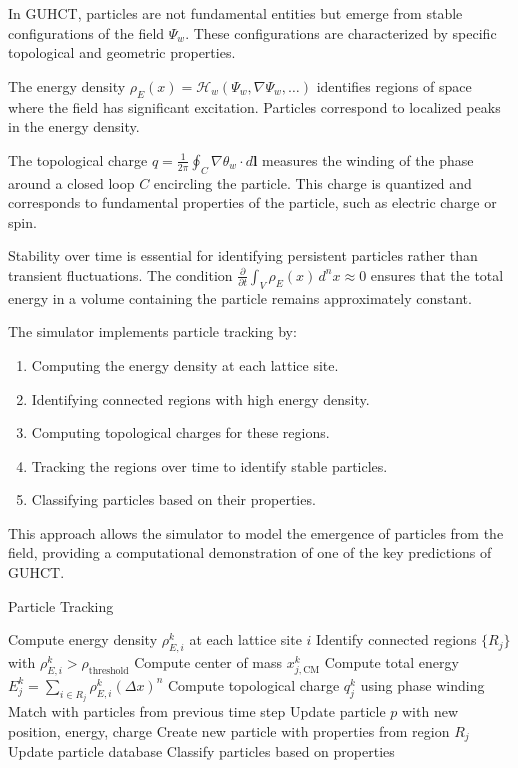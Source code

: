 \documentclass[11pt,a4paper]{article}
\makeatletter
\renewenvironment{proof}[1][\proofname]{\par
  \pushQED{\qed}%
  \normalfont \topsep6\p@\@plus6\p@\relax
  \trivlist
  \item[\hskip\labelsep
        \itshape
    #1\@addpunct{.}]\ignorespaces
}{%
  \popQED\endtrivlist\@endpefalse
}
\makeatother
\begin{document}
\begin{proof}
In GUHCT, particles are not fundamental entities but emerge from stable configurations of the field $\Psi_w$. These configurations are characterized by specific topological and geometric properties.

The energy density $\rho_E(x) = \mathcal{H}_w(\Psi_w, \nabla\Psi_w, \ldots)$ identifies regions of space where the field has significant excitation. Particles correspond to localized peaks in the energy density.

The topological charge $q = \frac{1}{2\pi} \oint_C \nabla\theta_w \cdot d\mathbf{l}$ measures the winding of the phase around a closed loop $C$ encircling the particle. This charge is quantized and corresponds to fundamental properties of the particle, such as electric charge or spin.

Stability over time is essential for identifying persistent particles rather than transient fluctuations. The condition $\frac{\partial}{\partial t} \int_V \rho_E(x) \, d^nx \approx 0$ ensures that the total energy in a volume containing the particle remains approximately constant.

The simulator implements particle tracking by:
\begin{enumerate}
    \item Computing the energy density at each lattice site.
    \item Identifying connected regions with high energy density.
    \item Computing topological charges for these regions.
    \item Tracking the regions over time to identify stable particles.
    \item Classifying particles based on their properties.
\end{enumerate}

This approach allows the simulator to model the emergence of particles from the field, providing a computational demonstration of one of the key predictions of GUHCT.
\end{proof}

\begin{algorithm}
\caption{Particle Tracking}
\label{alg:particle_tracking}
\begin{algorithmic}[1]
    \State Compute energy density $\rho_{E,i}^k$ at each lattice site $i$
    \State Identify connected regions $\{R_j\}$ with $\rho_{E,i}^k > \rho_{\text{threshold}}$
        \State Compute center of mass $x_{j,\text{CM}}^k$
        \State Compute total energy $E_j^k = \sum_{i \in R_j} \rho_{E,i}^k (\Delta x)^n$
        \State Compute topological charge $q_j^k$ using phase winding
        \State Match with particles from previous time step
            \State Update particle $p$ with new position, energy, charge
        \Else
            \State Create new particle with properties from region $R_j$
        \EndIf
    \EndFor
    \State Update particle database
    \State Classify particles based on properties
\EndProcedure
\end{algorithmic}
\end{algorithm}
\end{document}
